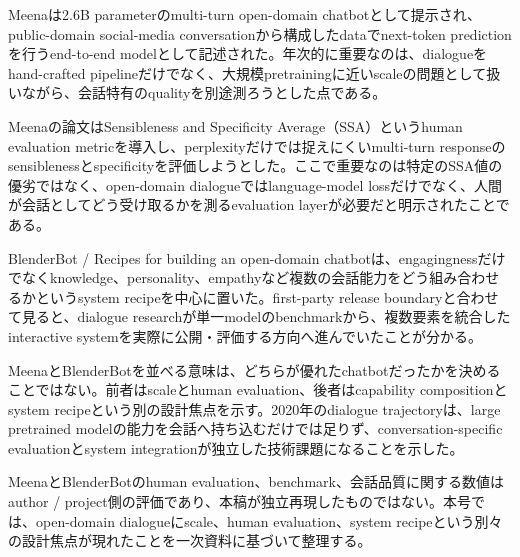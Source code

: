 
Meenaは2.6B parameterのmulti-turn open-domain chatbotとして提示され、public-domain social-media conversationから構成したdataでnext-token predictionを行うend-to-end modelとして記述された。年次的に重要なのは、dialogueをhand-crafted pipelineだけでなく、大規模pretrainingに近いscaleの問題として扱いながら、会話特有のqualityを別途測ろうとした点である。\autocite{src-8930f1933983}


Meenaの論文はSensibleness and Specificity Average（SSA）というhuman evaluation metricを導入し、perplexityだけでは捉えにくいmulti-turn responseのsensiblenessとspecificityを評価しようとした。ここで重要なのは特定のSSA値の優劣ではなく、open-domain dialogueではlanguage-model lossだけでなく、人間が会話としてどう受け取るかを測るevaluation layerが必要だと明示されたことである。\autocite{src-8930f1933983}


BlenderBot / Recipes for building an open-domain chatbotは、engagingnessだけでなくknowledge、personality、empathyなど複数の会話能力をどう組み合わせるかというsystem recipeを中心に置いた。first-party release boundaryと合わせて見ると、dialogue researchが単一modelのbenchmarkから、複数要素を統合したinteractive systemを実際に公開・評価する方向へ進んでいたことが分かる。\autocite{src-66cb10bf43ff,src-8260c320e205}


MeenaとBlenderBotを並べる意味は、どちらが優れたchatbotだったかを決めることではない。前者はscaleとhuman evaluation、後者はcapability compositionとsystem recipeという別の設計焦点を示す。2020年のdialogue trajectoryは、large pretrained modelの能力を会話へ持ち込むだけでは足りず、conversation-specific evaluationとsystem integrationが独立した技術課題になることを示した。\autocite{src-66cb10bf43ff,src-8260c320e205,src-8930f1933983}


\begin{claimboundary}
MeenaとBlenderBotのhuman evaluation、benchmark、会話品質に関する数値はauthor / project側の評価であり、本稿が独立再現したものではない。本号では、open-domain dialogueにscale、human evaluation、system recipeという別々の設計焦点が現れたことを一次資料に基づいて整理する。\autocite{src-66cb10bf43ff,src-8260c320e205,src-8930f1933983}
\end{claimboundary}
